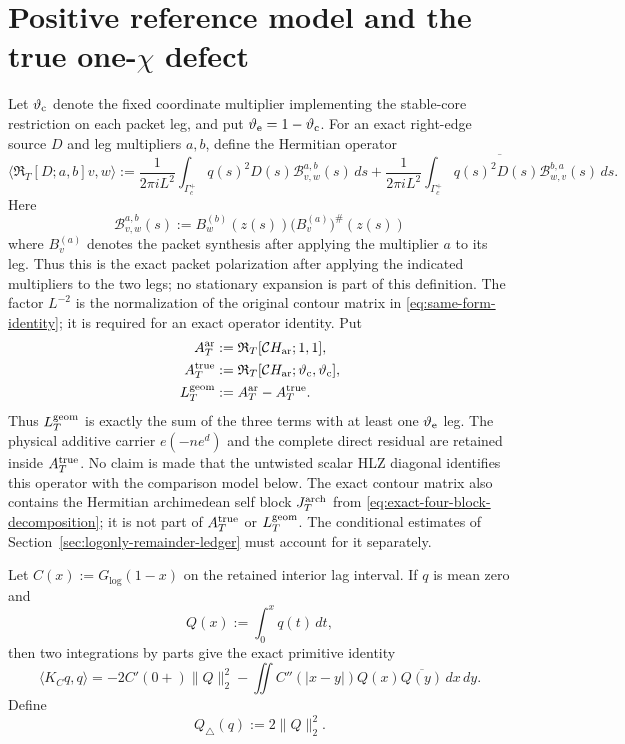 \section{Positive reference model and the true \texorpdfstring{one-$\chi$}{one-chi} defect}
\label{sec:model-floor}

Let $\vartheta_{\rm c}$ denote the fixed coordinate multiplier implementing the
stable-core restriction on each packet leg, and put
$\vartheta_{\rm e}=1-\vartheta_{\rm c}$.  For an exact right-edge source $D$
and leg multipliers $a,b$, define the Hermitian operator
\begin{equation}
\langle\mathfrak R_T[D;a,b]v,w\rangle
:=\frac1{2\pi iL^2}\int_{\Gamma_c^+}q(s)^2D(s)
 \mathcal B_{v,w}^{a,b}(s)\,ds
+\overline{\frac1{2\pi iL^2}\int_{\Gamma_c^+}q(s)^2D(s)
 \mathcal B_{w,v}^{b,a}(s)\,ds}.
\label{eq:exact-right-edge-operator}
\end{equation}
Here
\[
\mathcal B_{v,w}^{a,b}(s):=B_w^{(b)}(z(s))
 \bigl(B_v^{(a)}\bigr)^\#(z(s))
\]
where $B_v^{(a)}$ denotes the packet synthesis after applying the multiplier
$a$ to its leg.  Thus this is the exact packet polarization after applying the
indicated multipliers to the two legs; no stationary expansion is part of this
definition.  The factor $L^{-2}$ is the normalization of the original contour
matrix in \eqref{eq:same-form-identity}; it is required for an exact operator
identity. Put
\begin{align}
A_T^{\rm ar}&:=\mathfrak R_T[\mathcal C H_{\rm ar};1,1],\notag\\
A_T^{\rm true}&:=\mathfrak R_T[\mathcal C H_{\rm ar};
 \vartheta_{\rm c},\vartheta_{\rm c}],                      \label{eq:true-logonly-operator}\\
L_T^{\rm geom}&:=A_T^{\rm ar}-A_T^{\rm true}.               \label{eq:exact-geometric-leakage}
\end{align}
Thus $L_T^{\rm geom}$ is exactly the sum of the three terms with at least one
$\vartheta_{\rm e}$ leg.  The physical additive carrier $e(-ne^d)$ and the
complete direct residual are retained inside $A_T^{\rm true}$.  No claim is
made that the untwisted scalar HLZ diagonal identifies this operator with the
comparison model below.
The exact contour matrix also contains the Hermitian archimedean self block
$J_T^{\rm arch}$ from \eqref{eq:exact-four-block-decomposition}; it is not part
of $A_T^{\rm true}$ or $L_T^{\rm geom}$. The conditional estimates of
Section~\ref{sec:logonly-remainder-ledger} must account for it separately.

Let $C(x):=G_{\log}(1-x)$ on the retained interior lag interval.  If $q$ is
mean zero and
\[
Q(x):=\int_0^xq(t)\,dt,
\]
then two integrations by parts give the exact primitive identity
\begin{equation}
\boxed{
\langle K_Cq,q\rangle
=-2C'(0+)\|Q\|_2^2
-\iint C''(|x-y|)Q(x)\overline{Q(y)}\,dx\,dy.
}
\label{eq:primitive-identity}
\end{equation}
Define
\[
Q_\triangle(q):=2\|Q\|_2^2.
\]

